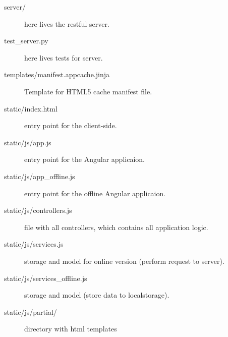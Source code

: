 \documentclass[12pt,a4paper]{article}
\begin{document}
    \begin{description}
        \item[server/] here lives the restful server.
        \item[test\_server.py] here lives tests for server.
        \item[templates/manifest.appcache.jinja] Template for HTML5 cache manifest file.
        \item[static/index.html] entry point for the client-side.
        \item[static/js/app.js] entry point for the Angular applicaion.
        \item[static/js/app\_offline.js] entry point for the offline Angular applicaion.
        \item[static/js/controllers.js] file with all controllers, which contains all application logic.
        \item[static/js/services.js] storage and model for online version (perform request to server).
        \item[static/js/services\_offline.js] storage and model (store data to localstorage).
        \item[static/js/partial/] directory with html templates
    \end{description}
\end{document}
